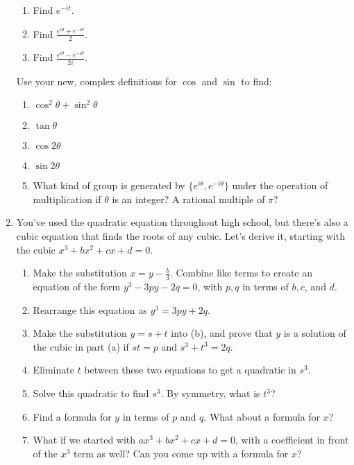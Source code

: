 \documentclass[../gatm.tex]{subfiles}
\begin{document}
\begin{enumerate}
\begin{multicols}{3}
\begin{enumerate}
\item Find $e^{-it}$. 
\item Find $\frac{e^{i\theta} + e^{-i\theta}}{2}$.
\item Find $\frac{e^{i\theta} - e^{-i\theta}}{2i}$.
\setcounter{cg_problem_ii}{\value{enumii}}
\end{enumerate}
\end{multicols}
Use your new, complex definitions for $\cos$ and $\sin$ to find:%
\begin{multicols}{2}
\begin{enumerate}
\setcounter{enumii}{\value{cg_problem_ii}}
\item $\cos^2\theta + \sin^2\theta$
\item $\tan\theta$
\item $\cos 2\theta$
\item $\sin 2\theta$
\item What kind of group is generated by $\{ e^{i\theta}, e^{-i\theta}\}$ under the operation of multiplication if $\theta$ is an integer? A rational multiple of $\pi$?
\end{enumerate}
\end{multicols}
\item You've used the quadratic equation throughout high school, but there's also a cubic equation that finds the roots of any cubic. Let's derive it, starting with the cubic $x^3+bx^2+cx+d=0$.
\begin{enumerate}
\item Make the substitution $x=y-\frac{b}{3}$. Combine like terms to create an equation of the form $y^3-3py-2q=0$, with $p,q$ in terms of $b,c$, and $d$.
\item Rearrange this equation as $y^3=3py+2q$.
\item Make the substitution $y=s+t$ into (b), and prove that $y$ is a solution of the cubic in part (a) if $st=p$ and $s^3+t^3=2q$.
\item Eliminate $t$ between these two equations to get a quadratic in $s^3$.
\item Solve this quadratic to find $s^3$. By symmetry, what is $t^3$?
\item Find a formula for $y$ in terms of $p$ and $q$. What about a formula for $x$?
\item What if we started with $ax^3+bx^2+cx+d=0$, with a coefficient in front of the $x^3$ term as well? Can you come up with a formula for $x$?

\end{enumerate}
\end{enumerate}
\end{document}
